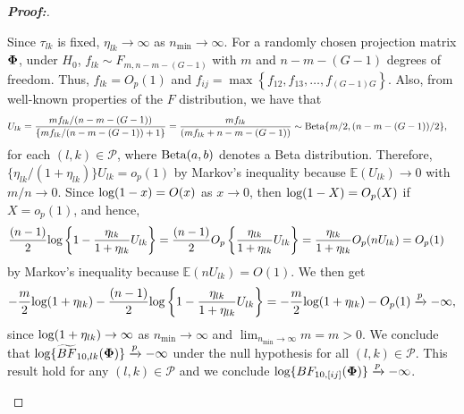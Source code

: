 \documentclass[pdflatex,sn-basic]{sn-jnl}%
\def\log{\hbox{log}}
\def\Beta{\hbox{Beta}}
\def\log{\hbox{log}}
\def\Beta{\hbox{Beta}}
\def\bse{\begin{eqnarray*}}
\def\ese{\end{eqnarray*}}
\newcommand{\uPhi}              {\mbox{\boldmath$\Phi$}}
\theoremstyle{thmstyleone}%
\theoremstyle{thmstyletwo}%
\theoremstyle{thmstylethree}%
\begin{document}
\begin{appendices}
\begin{proof}[\textbf{\upshape Proof:}]
\begin{description}
Since $\tau_{lk}$ is fixed, $\eta_{lk} \rightarrow \infty$ as $n_{\min} \to \infty$.
For a randomly chosen projection matrix $\uPhi$, under $H_{0}$, $f_{lk}  \sim F_{m, n-m-(G-1)}$ with $m$ and $n - m -(G-1)$ degrees of freedom.
Thus, $f_{lk} = O_{p}(1)$ and $f_{ij} = \max\left\{f_{12}, f_{13}, \ldots, f_{(G-1)G} \right\}$.
Also, from well-known properties of the $F$ distribution, we have that
\begin{align*}
U_{lk} & = \frac{m f_{lk}/(n-m-(G-1) )}{\{m f_{lk}/(n-m- (G-1) ) + 1\}} 
  =\frac{m f_{lk}}{( m f_{lk} +n-m- (G-1))} \sim \Beta\{m/2, (n-m-(G-1))/2 \},
\end{align*}
for each {$(l, k)\in\mathcal{P}$}, where $\Beta(a, b)$ denotes a Beta distribution.
Therefore, $\{\eta_{lk}/(1 + \eta_{lk})\} U_{lk} = o_{p}(1)$ by Markov's inequality because $\mathbb{E}(U_{lk}) \to 0$ with $m/n\to 0$.
Since $\log(1 - x) = O(x)$ as $x\to 0$, then $\log(1 - X) = O_p(X)$ if $X = o_p(1)$, and hence,
\begin{align*}
    \frac{(n - 1)}{2}\log\left\{1 - \frac{\eta_{lk}}{1 + \eta_{lk}}U_{lk}\right\}
    & = \frac{(n - 1)}{2}O_p\left\{\frac{\eta_{lk}}{1 + \eta_{lk}}U_{lk}\right\} = \frac{\eta_{lk}}{1 + \eta_{lk}}O_p(nU_{lk}) = O_p(1)
\end{align*}
by Markov's inequality because $\mathbb{E}(nU_{lk}) = O(1)$. 
We then get
\bse
-\frac{m}{2}\log(1 + \eta_{lk}) -\frac{(n-1)}{2}\log\left\{1 - \frac{\eta_{lk}}{1 + \eta_{lk}}U_{lk}\right\}
= -\frac{m}{2}\log(1 + \eta_{lk}) - O_p(1) \xrightarrow[]{p} -\infty,
\ese
since $\log(1 + \eta_{lk}) \rightarrow \infty$ as $n_{\min} \rightarrow \infty$ and $\lim_{n_{\min} \rightarrow \infty} m = m > 0$.
We conclude that $\log\{\widetilde{BF}_{10,lk}(\uPhi)\} \xrightarrow[]{p} -\infty$ under the null hypothesis for all $(l, k)\in\mathcal{P}$.
This result hold for any $(l,k) \in \mathcal{P}$ and we conclude $\log\{BF_{10,[ij]}(\uPhi)\} \xrightarrow[]{p} -\infty$. 


\end{description}
\end{proof}
\end{appendices}
\end{document}
